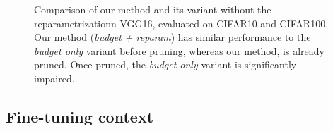 \begin{figure}
  \centering
  \caption{Comparison of our method and its variant without the
  reparametrizationn VGG16, evaluated on CIFAR10 and CIFAR100. Our method
  (\emph{budget + reparam}) has similar performance to the \emph{budget only}
  variant before pruning, whereas our method, is already pruned. Once pruned,
  the \emph{budget only} variant is significantly impaired.}
  \label{fig:chap1:budget_only_vgg16}
\end{figure}



\subsection{Fine-tuning context}
\label{sec:chap1:impact_of_fine_tuning}


